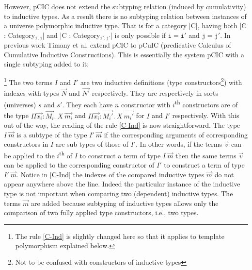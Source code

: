\documentclass{easychair}
\begin{document}
However, pCIC does not extend the subtyping relation (induced by
cumulativity) to inductive types. As a result there is no subtyping
relation between instances of a universe polymorphic inductive type.
That is for a category \Coqe|C|, having both
\Coqe|C : Category$_{\mathtt{i, j}}$| and \Coqe|C : Category$_{\mathtt{i', j'}}$|
is only possible if $\mathtt{i = i'}$ and $\mathtt{j = j'}$.
In previous work Timany et al. \cite{DBLP:conf/ictac/Timany015} extend
pCIC to pCuIC (predicative Calculus of Cumulative Inductive
Constructions). This is essentially the system pCIC with a single
subtyping added to it:\footnotemark{}
\begin{mathpar}
\end{mathpar}
\footnote{The rule \ref{C-Ind} is slightly changed here so that it applies to
 template polymorphism explained below. }
The two terms $I$ and $I'$ are two inductive definitions (type
constructors\footnote{Not to be confused with constructors of
  inductive types}) with indexes with types $\vec{N}$ and $\vec{N'}$
respectively. They are respectively in sorts (universes) $s$ and $s'$.
They each have $n$ constructor with $i$\textsuperscript{th}
constructors are of the type $\Pi\vec{x_i} : \vec{M_i}.~X~\vec{m_i}$
and $\Pi\vec{x_i} : \vec{M_i'}.~X~\vec{m_i'}$ for $I$ and $I'$
respectively. With this out of the way, the reading of the rule
\ref{C-Ind} is now straightforward. The type $I~\vec{m}$ is a subtype
of the type $I'~\vec{m}$ if the corresponding arguments of
corresponding constructors in $I$ are sub types of those of $I'$.  In
other words, if the terms $\vec{v}$ can be applied to the
$i$\textsuperscript{th} of $I$ to construct a term of type $I~\vec{m}$
then the same terms $\vec{v}$ can be applied to the corresponding
constructor of $I'$ to construct a term of type $I'~\vec{m}$.  Notice
in \ref{C-Ind} the indexes of the compared inductive types $\vec{m}$
do not appear anywhere above the line. Indeed the particular instance
of the inductive type is not important when comparing two (dependent)
inductive types. The terms $\vec{m}$ are added because subtyping of
inductive types allows only the comparison of two fully applied type
constructors, i.e., two types.
\end{document}
